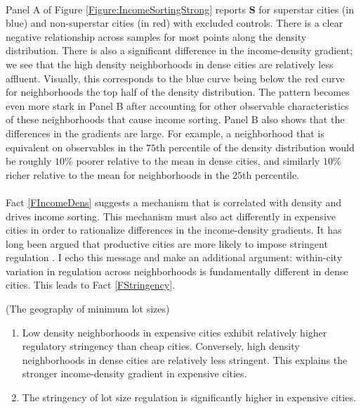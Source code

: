 \documentclass[12pt]{article}
\begin{document}
	\paragraph*{}
	Panel A of Figure \ref{Figure:IncomeSortingStrong} reports $\mathbf{S}$ for superstar cities (in blue) and non-superstar cities (in red) with excluded controls. There is a clear negative relationship across samples for most points along the density distribution. There is also a significant difference in the income-density gradient; we see that the high density neighborhoods in dense cities are relatively less affluent. Visually, this corresponds to the blue curve being below the red curve for neighborhoods the top half of the density distribution. The pattern becomes even more stark in Panel B after accounting for other observable characteristics of these neighborhoods that cause income sorting. Panel B also shows that the differences in the gradients are large. For example, a neighborhood that is equivalent on observables in the $75$th percentile of the density distribution would be roughly $10$\% poorer relative to the mean in dense cities, and similarly $10$\% richer relative to the mean for neighborhoods in the $25$th percentile. 

	\paragraph*{} 
	Fact \ref{FIncomeDens} suggests a mechanism that is correlated with density and drives income sorting. This mechanism must also act differently in expensive cities in order to rationalize differences in the income-density gradients. It has long been argued that productive cities are more likely to impose stringent regulation \citep{HILBER2013,parkho, durantonpugaurbgrowth}. I echo this message and make an additional argument: within-city variation in regulation across neighborhoods is fundamentally different in dense cities. This leads to Fact \ref{FStringency}. 

	\begin{Fact}\label{FStringency}
		(The geography of minimum lot sizes)
		\begin{enumerate}
			\item  Low density neighborhoods in expensive cities exhibit relatively higher regulatory stringency than cheap cities. Conversely, high density neighborhoods in dense cities are relatively less stringent. This explains the stronger income-density gradient in expensive cities. 		
			\item  The stringency of lot size regulation is significantly higher in expensive cities. 
		\end{enumerate}
	\end{Fact}
	
\end{document}
